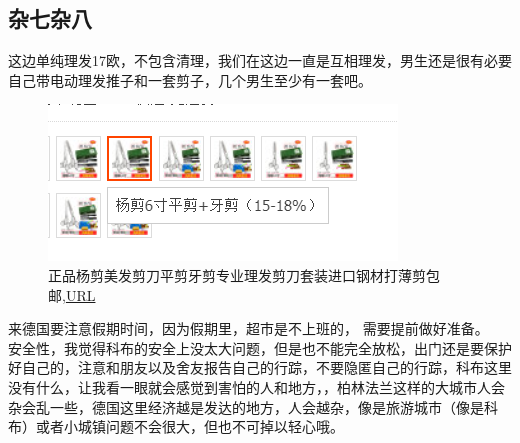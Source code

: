 \documentclass[doku.tex]{subfiles}
\begin{document}
\subsection{杂七杂八}
这边单纯理发17欧，不包含清理，我们在这边一直是互相理发，男生还是很有必要自己带电动理发推子和一套剪子，几个男生至少有一套吧。

\begin{figure}[H]
	\centering
	\includegraphics[width=0.7\linewidth]{screenshot003}
	\caption{正品杨剪美发剪刀平剪牙剪专业理发剪刀套装进口钢材打薄剪包邮,\href{https://item.taobao.com/item.htm?spm=a1z09.2.0.0.70932e8d1wonf8&id=12950418954&_u=avoelvl5e94}{URL}}
	\label{fig:screenshot003}
\end{figure}

来德国要注意假期时间，因为假期里，超市是不上班的， 需要提前做好准备。\\

安全性，我觉得科布的安全上没太大问题，但是也不能完全放松，出门还是要保护好自己的，注意和朋友以及舍友报告自己的行踪，不要隐匿自己的行踪，科布这里没有什么，让我看一眼就会感觉到害怕的人和地方，，柏林法兰这样的大城市人会杂会乱一些，德国这里经济越是发达的地方，人会越杂，像是旅游城市（像是科布）或者小城镇问题不会很大，但也不可掉以轻心哦。
\end{document}
